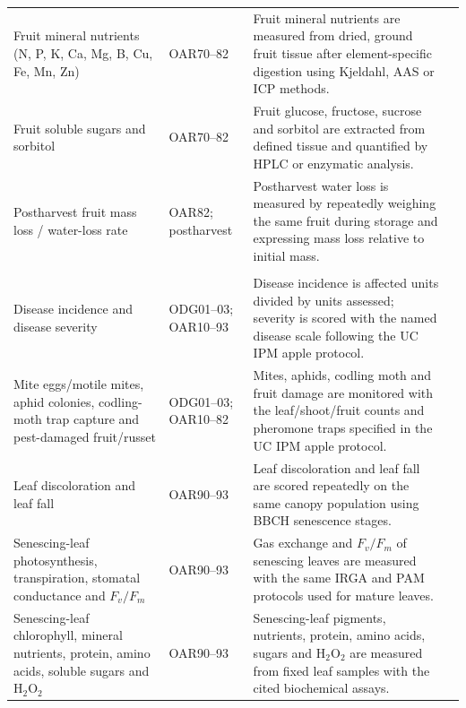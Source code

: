 \begin{landscape}
\begin{longtable}{>{\RaggedRight\arraybackslash}p{5.1cm} >{\RaggedRight\arraybackslash}p{2.3cm} >{\RaggedRight\arraybackslash}p{16.7cm} >{\RaggedRight\arraybackslash}p{2.4cm}}
Fruit mineral nutrients (N, P, K, Ca, Mg, B, Cu, Fe, Mn, Zn) &
OAR70--82 &
Fruit mineral nutrients are measured from dried, ground fruit tissue after element-specific digestion using Kjeldahl, AAS or ICP methods. &
\citep{nachtigall2006}\\

Fruit soluble sugars and sorbitol &
OAR70--82 &
Fruit glucose, fructose, sucrose and sorbitol are extracted from defined tissue and quantified by HPLC or enzymatic analysis. &
\citep{filip2016}\\

Postharvest fruit mass loss / water-loss rate &
OAR82; postharvest &
Postharvest water loss is measured by repeatedly weighing the same fruit during storage and expressing mass loss relative to initial mass. &
\citep{johnston2009}\\

\multicolumn{4}{l}{\textbf{IPDM, senescence and end of productive life}}\\
Disease incidence and disease severity &
ODG01--03; OAR10--93 &
Disease incidence is affected units divided by units assessed; severity is scored with the named disease scale following the UC IPM apple protocol. &
\citep{ucipm_apple}\\

Mite eggs/motile mites, aphid colonies, codling-moth trap capture and pest-damaged fruit/russet &
ODG01--03; OAR10--82 &
Mites, aphids, codling moth and fruit damage are monitored with the leaf/shoot/fruit counts and pheromone traps specified in the UC IPM apple protocol. &
\citep{ucipm_apple}\\

Leaf discoloration and leaf fall &
OAR90--93 &
Leaf discoloration and leaf fall are scored repeatedly on the same canopy population using BBCH senescence stages. &
\citep{meier1994}\\

Senescing-leaf photosynthesis, transpiration, stomatal conductance and $F_v/F_m$ &
OAR90--93 &
Gas exchange and $F_v/F_m$ of senescing leaves are measured with the same IRGA and PAM protocols used for mature leaves. &
\citep{tartachnyk2004}\\

Senescing-leaf chlorophyll, mineral nutrients, protein, amino acids, soluble sugars and H$_2$O$_2$ &
OAR90--93 &
Senescing-leaf pigments, nutrients, protein, amino acids, sugars and H$_2$O$_2$ are measured from fixed leaf samples with the cited biochemical assays. &
\citep{spencer1972,nachtigall2006,sapkota2021}\\


\end{longtable}
\end{landscape}
